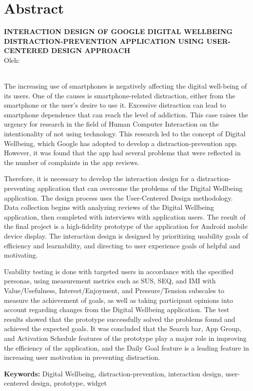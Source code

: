 \clearpage
\chapter*{Abstract}

\begin{center}
  \textbf{\MakeUppercase{Interaction Design of Google Digital Wellbeing Distraction-Prevention Application using User-Centered Design Approach}} \\[1em]
  
  Oleh: \\
  \MakeUppercase{\theauthor} \\

\end{center}

\begin{singlespace}
  The increasing use of smartphones is negatively affecting the digital well-being of its users. One of the causes is smartphone-related distraction, either from the smartphone or the user's desire to use it. Excessive distraction can lead to smartphone dependence that can reach the level of addiction. This case raises the urgency for research in the field of Human Computer Interaction on the intentionality of not using technology. This research led to the concept of Digital Wellbeing, which Google has adopted to develop a distraction-prevention app. However, it was found that the app had several problems that were reflected in the number of complaints in the app reviews.

  Therefore, it is necessary to develop the interaction design for a distraction-preventing application that can overcome the problems of the Digital Wellbeing application. The design process uses the User-Centered Design methodology. Data collection begins with analyzing reviews of the Digital Wellbeing application, then completed with interviews with application users. The result of the final project is a high-fidelity prototype of the application for Android mobile device display. The interaction design is designed by prioritizing usability goals of efficiency and learnability, and directing to user experience goals of helpful and motivating.

  Usability testing is done with targeted users in accordance with the specified personas, using measurement metrics such as SUS, SEQ, and IMI with Value/Usefulness, Interest/Enjoyment, and Pressure/Tension subscales to measure the achievement of goals, as well as taking participant opinions into account regarding changes from the Digital Wellbeing application. The test results showed that the prototype successfully solved the problems found and achieved the expected goals. It was concluded that the Search bar, App Group, and Activation Schedule features of the prototype play a major role in improving the efficiency of the application, and the Daily Goal feature is a leading feature in increasing user motivation in preventing distraction.

  \noindent \textbf{Keywords:} Digital Wellbeing, distraction-prevention, interaction design, user-centered design, prototype, widget

\end{singlespace}
